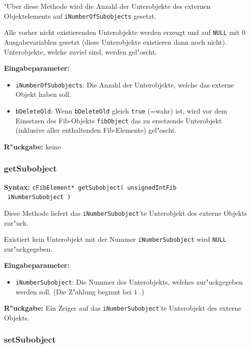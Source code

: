 \bigskip\noindent
"Uber diese Methode wird die Anzahl der Unterobjekte des externen Objektelements auf \verb|iNumberOfSubobjects| gesetzt.

Alle vorher nicht existierenden Unterobjekte werden erzeugt und auf \verb|NULL| mit $0$ Ausgabevariablen gesetzt (diese Unterobjekte existieren dann noch nicht). Unterobjekte, welche zuviel sind, werden gel"oscht.

\bigskip\noindent
\textbf{Eingabeparameter:}
\begin{itemize}
 \item \verb|iNumberOfSubobjects|: Die Anzahl der Unterobjekte, welche das externe Objekt haben soll.
 \item \verb|bDeleteOld|: Wenn \verb|bDeleteOld| gleich \verb|true| (=wahr) ist, wird vor dem Einsetzen des Fib-Objekts \verb|fibObject| das zu ersetzende Unterobjekt (inklusive aller enthaltenden Fib-Elemente) gel"oscht.
\end{itemize}

\bigskip\noindent
\textbf{R"uckgabe:} keine


\subsubsection{getSubobject}

\textbf{Syntax:} \verb|cFibElement* getSubobject( unsignedIntFib| \\\verb| iNumberSubobject )|

\bigskip\noindent
Diese Methode liefert das \verb|iNumberSubobject|'te Unterobjekt des externe Objekts zur"uck.

Existiert kein Unterobjekt mit der Nummer \verb|iNumberSubobject| wird \verb|NULL| zur"uckgegeben.

\bigskip\noindent
\textbf{Eingabeparameter:}
\begin{itemize}
 \item \verb|iNumberSubobject|: Die Nummer des Unterobjekts, welches zur"uckgegeben werden soll. (Die Z"ahlung beginnt bei $1$ .)
\end{itemize}

\bigskip\noindent
\textbf{R"uckgabe:} Ein Zeiger auf das \verb|iNumberSubobject|'te Unterobjekt des externe Objekts.


\subsubsection{setSubobject}

